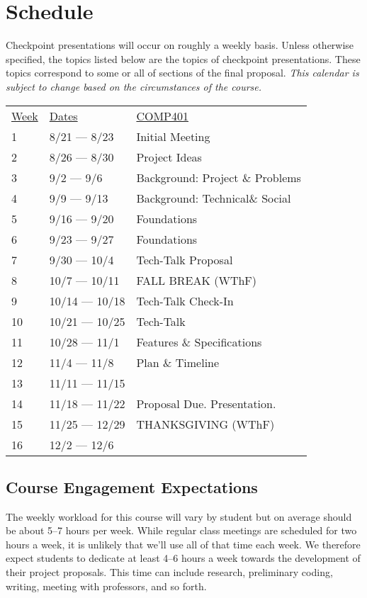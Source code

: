 \documentclass[nobib]{tufte-handout}
\begin{document}
\section{Schedule}


 Checkpoint presentations will occur on roughly a weekly basis. Unless otherwise specified, the topics listed below are the topics of checkpoint presentations. These topics correspond to some or all of sections of the final proposal. \textit{This calendar is subject to change based on the circumstances of the course.}

\begin{center}
\begin{tabular}{lll}
\underline{Week} & \underline{Dates} &  \underline{COMP401} \\
1 & 8/21 --- 8/23 & Initial Meeting   \\
2 & 8/26 --- 8/30 & Project Ideas   \\
3 & 9/2 --- 9/6 & Background: Project \& Problems   \\
4 & 9/9 --- 9/13 & Background: Technical\& Social    \\
5 & 9/16 --- 9/20 & Foundations  \\
6 & 9/23 --- 9/27 & Foundations   \\
7 & 9/30 --- 10/4 & Tech-Talk Proposal  \\
8 & 10/7 --- 10/11 & FALL BREAK (WThF)  \\
9 & 10/14 --- 10/18 & Tech-Talk Check-In   \\
10 & 10/21 --- 10/25 & Tech-Talk  \\
11 & 10/28 --- 11/1 &  Features \& Specifications   \\
12 & 11/4 --- 11/8 & Plan \& Timeline  \\
13 & 11/11 --- 11/15 &   \\
14 & 11/18 --- 11/22  &  Proposal Due. Presentation. \\
15 & 11/25 --- 12/29 & THANKSGIVING (WThF)   \\
16 & 12/2 --- 12/6 &  \\
\end{tabular}
\end{center}


\subsection{Course Engagement Expectations}

The weekly workload for this course will vary by student but on average should be about 5--7 hours per week.  While regular class meetings are scheduled for two hours a week, it is unlikely that we'll use all of that time each week.  We therefore expect students to dedicate at least 4--6 hours a week towards the development of their project proposals.  This time can include research, preliminary coding, writing, meeting with professors, and so forth.
\end{document}
